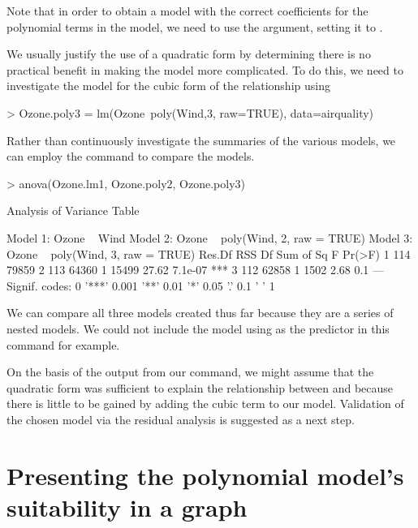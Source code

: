 Note that in order to obtain a model with the correct coefficients for the polynomial terms in the model, we need to use the  argument, setting it to .  
 
We usually justify the use of a quadratic form by determining there is no practical benefit in making the model more complicated. To do this, we need to investigate the model for the cubic form of the relationship using 

\begin{Schunk}
\begin{Sinput}
> Ozone.poly3 = lm(Ozone~poly(Wind,3, raw=TRUE), data=airquality) 
\end{Sinput}
\end{Schunk}

Rather than continuously investigate the summaries of the various models, we can employ the  command to compare the models.  

\begin{Schunk}
\begin{Sinput}
> anova(Ozone.lm1, Ozone.poly2, Ozone.poly3) 
\end{Sinput}
\begin{Soutput}
Analysis of Variance Table

Model 1: Ozone ~ Wind
Model 2: Ozone ~ poly(Wind, 2, raw = TRUE)
Model 3: Ozone ~ poly(Wind, 3, raw = TRUE)
  Res.Df   RSS Df Sum of Sq     F  Pr(>F)    
1    114 79859                               
2    113 64360  1     15499 27.62 7.1e-07 ***
3    112 62858  1      1502  2.68     0.1    
---
Signif. codes:  
0 '***' 0.001 '**' 0.01 '*' 0.05 '.' 0.1 ' ' 1
\end{Soutput}
\end{Schunk}

We can compare all three models created thus far because they are a series of nested models. We could not include the model using  as the predictor in this command for example. 
 
On the basis of the output from our  command, we might assume that the quadratic form was sufficient to explain the relationship between  and  because there is little to be gained by adding the cubic term to our model. Validation of the chosen model via the residual analysis is suggested as a next step. 
 
\section{Presenting the polynomial model's suitability in a graph} 
 

